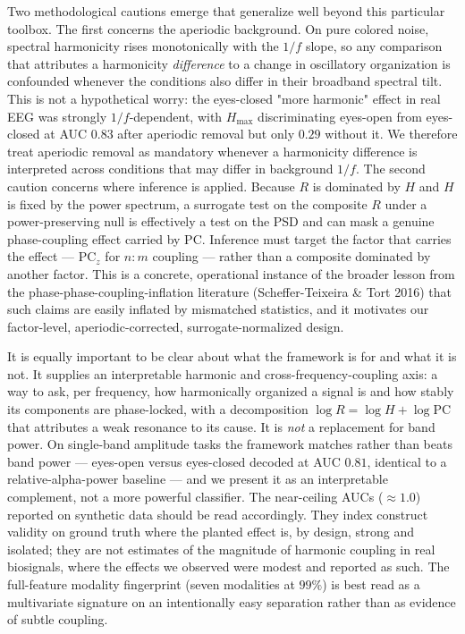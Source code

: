 \documentclass[11pt]{article}
\begin{document}
Two methodological cautions emerge that generalize well beyond this particular toolbox. The first concerns the aperiodic background. On pure colored noise, spectral harmonicity rises monotonically with the $1/f$ slope, so any comparison that attributes a harmonicity \emph{difference} to a change in oscillatory organization is confounded whenever the conditions also differ in their broadband spectral tilt. This is not a hypothetical worry: the eyes-closed "more harmonic" effect in real EEG was strongly $1/f$-dependent, with $H_{\max}$ discriminating eyes-open from eyes-closed at AUC $0.83$ after aperiodic removal but only $0.29$ without it. We therefore treat aperiodic removal as mandatory whenever a harmonicity difference is interpreted across conditions that may differ in background $1/f$. The second caution concerns where inference is applied. Because $R$ is dominated by $H$ and $H$ is fixed by the power spectrum, a surrogate test on the composite $R$ under a power-preserving null is effectively a test on the PSD and can mask a genuine phase-coupling effect carried by $\mathrm{PC}$. Inference must target the factor that carries the effect — $\mathrm{PC}_z$ for $n{:}m$ coupling — rather than a composite dominated by another factor. This is a concrete, operational instance of the broader lesson from the phase-phase-coupling-inflation literature (Scheffer-Teixeira \& Tort 2016) that such claims are easily inflated by mismatched statistics, and it motivates our factor-level, aperiodic-corrected, surrogate-normalized design.

It is equally important to be clear about what the framework is for and what it is not. It supplies an interpretable harmonic and cross-frequency-coupling axis: a way to ask, per frequency, how harmonically organized a signal is and how stably its components are phase-locked, with a decomposition $\log R = \log H + \log \mathrm{PC}$ that attributes a weak resonance to its cause. It is \emph{not} a replacement for band power. On single-band amplitude tasks the framework matches rather than beats band power — eyes-open versus eyes-closed decoded at AUC $0.81$, identical to a relative-alpha-power baseline — and we present it as an interpretable complement, not a more powerful classifier. The near-ceiling AUCs ($\approx 1.0$) reported on synthetic data should be read accordingly. They index construct validity on ground truth where the planted effect is, by design, strong and isolated; they are not estimates of the magnitude of harmonic coupling in real biosignals, where the effects we observed were modest and reported as such. The full-feature modality fingerprint (seven modalities at $99\%$) is best read as a multivariate signature on an intentionally easy separation rather than as evidence of subtle coupling.
\end{document}
